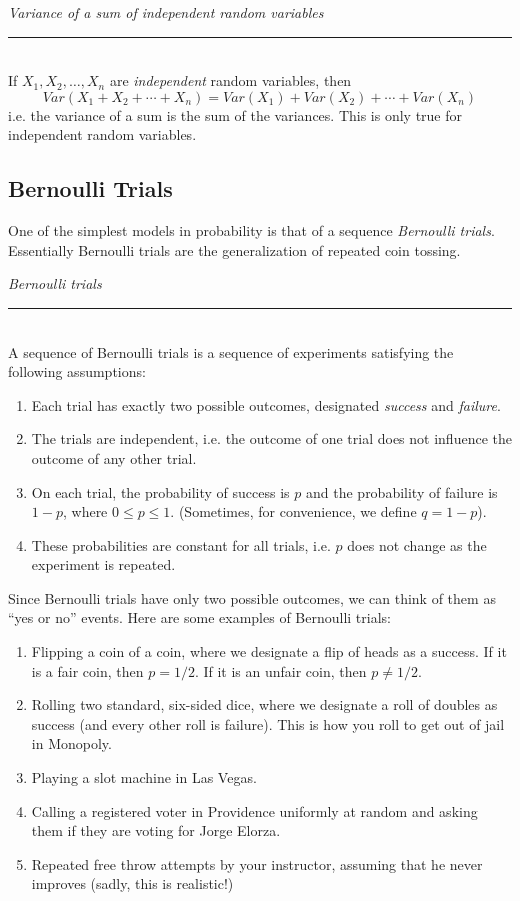 \documentclass[notes.tex]{subfiles}
\begin{document}
\begin{framed}
  \emph{Variance of a sum of independent random variables}\\
  \rule{\dimexpr{}\fboxrule}{.1pt} \\
If $X_1, X_2, \dots, X_n$ are \emph{independent} random variables, then
\[
Var(X_1 + X_2 + \cdots + X_n) = Var(X_1) + Var(X_2) + \cdots + Var(X_n)
\]
i.e. the variance of a sum is the sum of the variances. This is only true for independent random variables.
\end{framed}

\subsection{Bernoulli Trials}
One of the simplest models in probability is that of a sequence \emph{Bernoulli trials}. Essentially Bernoulli trials are the generalization of repeated coin tossing. 

\begin{framed}
  \emph{Bernoulli trials}\\
  \rule{\dimexpr{}\fboxrule}{.1pt} \\
A sequence of Bernoulli trials is a sequence of experiments satisfying the following assumptions:
\begin{enumerate}
\item Each trial has exactly two possible outcomes, designated \emph{success} and \emph{failure}.
\item The trials are independent, i.e. the outcome of one trial does not influence the outcome of any other trial.
\item On each trial, the probability of success is $p$ and the probability of failure is $1-p$, where $0 \leq p \leq 1$. (Sometimes, for convenience, we define $q = 1 - p$).
\item These probabilities are constant for all trials, i.e. $p$ does not change as the experiment is repeated.
\end{enumerate}
\end{framed}

Since Bernoulli trials have only two possible outcomes, we can think of them as ``yes or no'' events. Here are some examples of Bernoulli trials:
\begin{enumerate}
\item Flipping a coin of a coin, where we designate a flip of heads as a success. If it is a fair coin, then $p = 1/2$. If it is an unfair coin, then $p \neq 1/2$. 
\item Rolling two standard, six-sided dice, where we designate a roll of doubles as success (and every other roll is failure). This is how you roll to get out of jail in Monopoly.
\item Playing a slot machine in Las Vegas.
\item Calling a registered voter in Providence uniformly at random and asking them if they are voting for Jorge Elorza.
\item Repeated free throw attempts by your instructor, assuming that he never improves (sadly, this is realistic!)
\end{enumerate}
\end{document}
